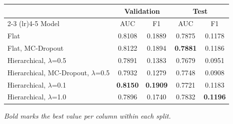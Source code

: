 \documentclass[a4paper,11pt]{article}
\begin{document}
\begin{center}
\label{tab:val-test-results}

\footnotesize
\renewcommand{\arraystretch}{1.5}
\setlength{\tabcolsep}{6pt}
\begin{tabular}{l cc cc}
\toprule
 & \multicolumn{2}{c}{Validation} & \multicolumn{2}{c}{Test} \\
\cmidrule(lr){2-3} \cmidrule(lr){4-5}
Model & AUC & F1 & AUC & F1 \\
\midrule
Flat                                  & 0.8108          & 0.1889          & 0.7875          & 0.1178 \\
Flat, MC-Dropout                      & 0.8122          & 0.1894          & \textbf{0.7881} & 0.1186 \\
Hierarchical, $\lambda$=0.5           & 0.7891          & 0.1383          & 0.7679          & 0.0951 \\
Hierarchical, MC-Dropout, $\lambda$=0.5 & 0.7932        & 0.1279          & 0.7748          & 0.0908 \\
Hierarchical, $\lambda$=0.1           & \textbf{0.8150} & \textbf{0.1909} & 0.7721          & 0.1183 \\
Hierarchical, $\lambda$=1.0           & 0.7896          & 0.1740          & 0.7832          & \textbf{0.1196} \\
\bottomrule
\end{tabular}
\end{center}

\vspace{4pt}
\footnotesize\textit{Bold marks the best value per column within each split.}

\vspace{24pt}
\end{document}
